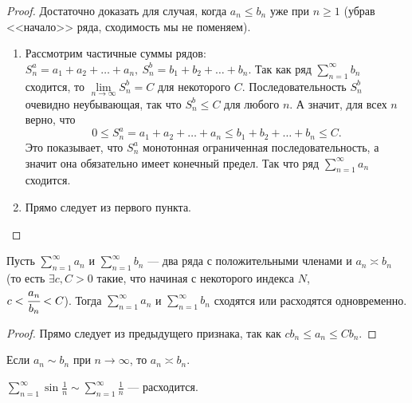 \begin{proof} Достаточно доказать для случая, когда $a_n \le b_n$ уже при $n \ge 1$ (убрав <<начало>> ряда, сходимость мы не поменяем).
\begin{enumerate}
\item Рассмотрим частичные суммы рядов: $S^a_n = a_1 + a_2 + \ldots + a_n,\ S^b_n = b_1 + b_2 + \ldots + b_n.$
Так как ряд $\sum\limits_{n=1}^{\infty} b_n$ сходится, то $\lim\limits_{n\to\infty} S^b_n = C$ для некоторого $C$. Последовательность $S^b_n$ очевидно неубывающая, так что $S^b_n \le C$ для любого $n$. А значит, для всех $n$ верно, что
$$ 0 \le S^a_n = a_1 + a_2 + \ldots + a_n \le b_1 + b_2 + \ldots + b_n \le C.$$
Это показывает, что  $S^a_n$ монотонная ограниченная последовательность, а значит она обязательно имеет конечный предел. Так что ряд $\sum\limits_{n=1}^{\infty} a_n$  сходится.
	
\item Прямо следует из первого пункта.
\end{enumerate}
\end{proof}

\begin{Test}
	Пусть $\sum\limits_{n=1}^{\infty} a_n$ и $\sum\limits_{n=1}^{\infty} b_n$ --- два ряда с положительными членами и $a_n \asymp b_n$ (то есть $\exists c, C> 0 $ такие, что начиная с некоторого индекса $N$, \\$c < \cfrac{a_n}{b_n}<C$). Тогда $\sum\limits_{n=1}^{\infty} a_n$ и $\sum\limits_{n=1}^{\infty} b_n$ сходятся или расходятся одновременно.
\end{Test}

\begin{proof}
	Прямо следует из предыдущего признака, так как $ cb_n \leqslant a_n\leqslant Cb_n$. 
\end{proof}
\begin{Comment}
	Если $a_n \sim b_n$ при $n \rightarrow \infty$, то $a_n \asymp b_n$.
\end{Comment}
\begin{Examples}[тривиальный]
	$\sum\limits_{n=1}^{\infty} \sin\frac{1}{n} \sim \sum\limits_{n=1}^{\infty} \frac{1}{n}$ --- расходится.
\end{Examples}

